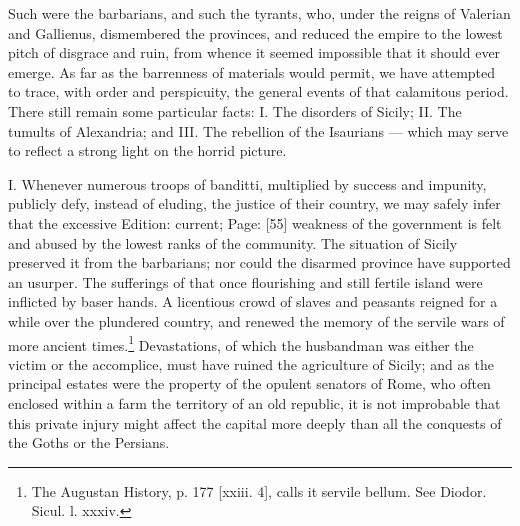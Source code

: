 Such were the barbarians, and such the tyrants, who, under the reigns of Valerian and Gallienus, dismembered the provinces, and reduced the empire to the lowest pitch of disgrace and ruin, from whence it seemed impossible that it should ever emerge. As far as the barrenness of materials would permit, we have attempted to trace, with order and perspicuity, the general events of that calamitous period. There still remain some particular facts: I. The disorders of Sicily; II. The tumults of Alexandria; and III. The rebellion of the Isaurians \texthebrew{—} which may serve to reflect a strong light on the horrid picture.

I. Whenever numerous troops of banditti, multiplied by success and impunity, publicly defy, instead of eluding, the justice of their country, we may safely infer that the excessive Edition: current; Page: [55] weakness of the government is felt and abused by the lowest ranks of the community. The situation of Sicily preserved it from the barbarians; nor could the disarmed province have supported an usurper. The sufferings of that once flourishing and still fertile island were inflicted by baser hands. A licentious crowd of slaves and peasants reigned for a while over the plundered country, and renewed the memory of the servile wars of more ancient times.\footnote{The Augustan History, p. 177 [xxiii. 4], calls it servile bellum. See Diodor. Sicul. l. xxxiv.} Devastations, of which the husbandman was either the victim or the accomplice, must have ruined the agriculture of Sicily; and as the principal estates were the property of the opulent senators of Rome, who often enclosed within a farm the territory of an old republic, it is not improbable that this private injury might affect the capital more deeply than all the conquests of the Goths or the Persians.

